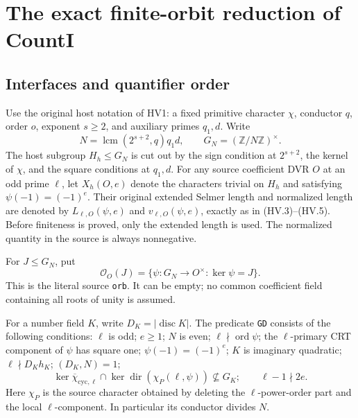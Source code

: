 \section{The exact finite-orbit reduction of CountI}
\label{sec:count-i-finite-orbit-audit}


\subsection{Interfaces and quantifier order}

Use the original host notation of HV1: a fixed primitive character
$\chi$, conductor $q$, order $o$, exponent $s\ge2$, and auxiliary
primes $q_1,d$.  Write
\[
 N=\operatorname{lcm}(2^{s+2},q)q_1d,
 \qquad G_N=(\mathbb Z/N\mathbb Z)^\times.
 \tag{KA.1}
\]
The host subgroup $H_h\le G_N$ is cut out by the sign condition at
$2^{s+2}$, the kernel of $\chi$, and the square conditions at $q_1,d$.
For any source coefficient DVR $O$ at an odd prime $\ell$, let
$X_h(O,e)$ denote the characters trivial on $H_h$ and satisfying
$\psi(-1)=(-1)^e$.  Their original extended Selmer length and
normalized length are denoted by $L_{\ell,O}(\psi,e)$ and
$v_{\ell,O}(\psi,e)$, exactly as in (HV.3)--(HV.5).  Before
finiteness is proved, only the extended length is used.  The
normalized quantity in the source is always nonnegative.

For $J\le G_N$, put
\[
 \mathcal O_O(J)=\{\psi:G_N\longrightarrow O^\times:
                         \ker\psi=J\}.
 \tag{KA.2}
\]
This is the literal source \texttt{orb}.  It can be empty; no common
coefficient field containing all roots of unity is assumed.

For a number field $K$, write $D_K=|\operatorname{disc}K|$.
The predicate \texttt{GD} consists of the following conditions:
$\ell$ is odd; $e\ge1$; $N$ is even; $\ell\nmid\operatorname{ord}\psi$;
the $\ell$-primary CRT component of $\psi$ has square one;
$\psi(-1)=(-1)^e$; $K$ is imaginary quadratic;
$\ell\nmid D_Kh_K$; $(D_K,N)=1$;
\[
 \ker\overline\chi_{\mathrm{cyc},\ell}
   \cap\ker\operatorname{dir}(\chi_P(\ell,\psi))
       \not\subseteq G_K;
 \qquad \ell-1\nmid2e.
 \tag{KA.3}
\]
Here $\chi_P$ is the source character obtained by deleting the
$\ell$-power-order part and the local $\ell$-component.  In
particular its conductor divides $N$.

